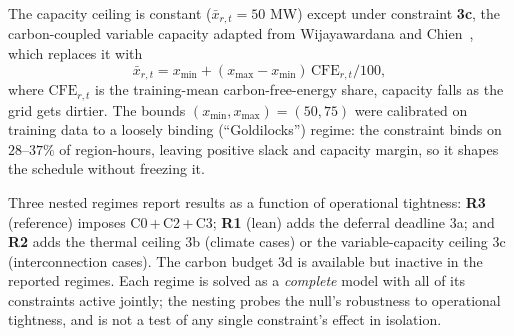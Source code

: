 \documentclass[12pt]{article}
\begin{document}
The capacity ceiling is constant ($\bar x_{r,t}=50$ MW) except under constraint
\textbf{3c}, the carbon-coupled variable capacity adapted from Wijayawardana and
Chien~\citep{wijayawardana2025}, which replaces it with
\begin{equation}
\bar x_{r,t}=x_{\min}+(x_{\max}-x_{\min})\,\mathrm{CFE}_{r,t}/100,
\label{eq:varcap}
\end{equation}
where $\mathrm{CFE}_{r,t}$ is the training-mean carbon-free-energy share, capacity
falls as the grid gets dirtier. The bounds $(x_{\min},x_{\max})=(50,75)$ were
calibrated on training data to a loosely binding (``Goldilocks'') regime: the
constraint binds on $28$--$37\%$ of region-hours, leaving positive slack and capacity
margin, so it shapes the schedule without freezing it.

Three nested regimes report results as a function of operational tightness:
\textbf{R3} (reference) imposes C0\,+\,C2\,+\,C3; \textbf{R1} (lean) adds the deferral
deadline 3a; and \textbf{R2} adds the thermal ceiling 3b (climate cases) or the
variable-capacity ceiling 3c (interconnection cases). The carbon budget 3d is
available but inactive in the reported regimes. Each regime is solved as a
\emph{complete} model with all of its constraints active jointly; the nesting
probes the null's robustness to operational tightness, and is not a test of any
single constraint's effect in isolation.
\end{document}
